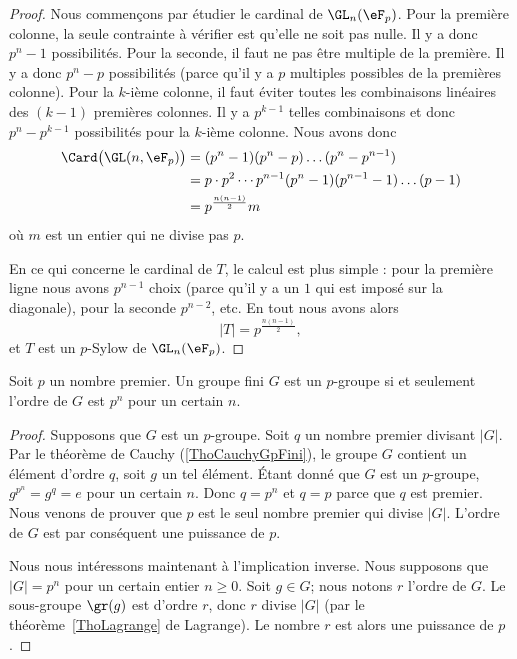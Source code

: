 \begin{proof}
    Nous commençons par étudier le cardinal de \( \GL_n(\eF_p)\). Pour la première colonne, la seule contrainte à vérifier est qu'elle ne soit pas nulle. Il y a donc \( p^n-1\) possibilités. Pour la seconde, il faut ne pas être multiple de la première. Il y a donc \( p^n-p\) possibilités (parce qu'il y a \( p\) multiples possibles de la premières colonne). Pour la \( k\)-ième colonne, il faut éviter toutes les combinaisons linéaires des \( (k-1)\) premières colonnes. Il y a \( p^{k-1}\) telles combinaisons et donc \( p^n-p^{k-1}\) possibilités pour la \( k\)-ième colonne. Nous avons donc
    \begin{subequations}
        \begin{align}
            \Card\big( \GL(n,\eF_{p}) \big)&=(p^n-1)(p^n-p)\ldots(p^n-p^{n-1})\\
            &=p\cdot p^2\cdots p^{n-1}(p^n-1)(p^{n-1}-1)\ldots (p-1)\\
            &=p^{\frac{ n(n-1) }{2}}m
        \end{align}
    \end{subequations}
    où \( m\) est un entier qui ne divise pas \( p\).

    En ce qui concerne le cardinal de \( T\), le calcul est plus simple : pour la première ligne nous avons \( p^{n-1}\) choix (parce qu'il y a un \( 1\) qui est imposé sur la diagonale), pour la seconde \( p^{n-2}\), etc. En tout nous avons alors
    \begin{equation}
        | T |=p^{\frac{ n(n-1) }{2}},
    \end{equation}
    et \( T\) est un \( p\)-Sylow de \( \GL_n(\eF_p)\).
\end{proof}


\begin{proposition}
    Soit \( p\) un nombre premier. Un groupe fini \( G\) est un $p$-groupe si et seulement l'ordre de \( G\) est \( p^n\) pour un certain \( n\).
\end{proposition}

\begin{proof}
    Supposons que \( G\) est un $p$-groupe. Soit \( q\) un nombre premier divisant \( | G |\). Par le théorème de Cauchy (\ref{ThoCauchyGpFini}), le groupe \( G\) contient un élément d'ordre \( q\), soit \( g\) un tel élément. Étant donné que \( G\) est un $p$-groupe, \( g^{p^n}=g^q=e\) pour un certain \( n\). Donc $q=p^n$ et \( q=p\) parce que \( q\) est premier. Nous venons de prouver que \( p\) est le seul nombre premier qui divise \( | G |\). L'ordre de \( G\) est par conséquent une puissance de \( p\).

    Nous nous intéressons maintenant à l'implication inverse. Nous supposons que \( | G |=p^n\) pour un certain entier \( n\geq 0\). Soit \( g\in G\); nous notons \( r\) l'ordre de \( G\). Le sous-groupe \( \gr(g)\) est d'ordre \( r\), donc \( r\) divise \( | G |\) (par le théorème~\ref{ThoLagrange} de Lagrange). Le nombre \( r\) est alors une puissance de \( p\).
\end{proof}

